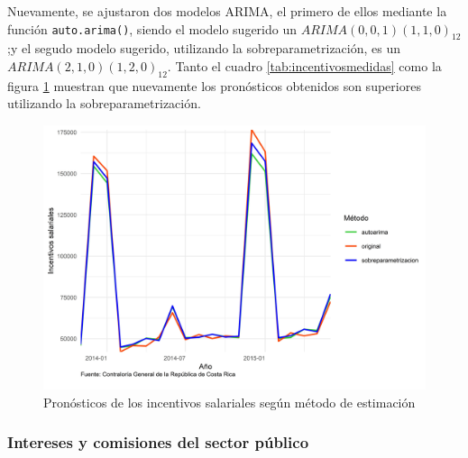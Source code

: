 \documentclass[
]{article}
\begin{document}
Nuevamente, se ajustaron dos modelos ARIMA, el primero de ellos mediante
la función \texttt{auto.arima()}, siendo el modelo sugerido un
\(ARIMA(0,0,1)(1,1,0)_{12}\);y el segudo modelo sugerido, utilizando la
sobreparametrización, es un \(ARIMA(2,1,0)(1,2,0)_{12}\). Tanto el
cuadro \ref{tab:incentivosmedidas} como la figura
\ref{fig:incentivosplotpronostico} muestran que nuevamente los
pronósticos obtenidos son superiores utilizando la sobreparametrización.

\begin{table}[!h]

\caption{\label{tab:unnamed-chunk-17}\label{tab:incentivosmedidas}Medidas de rendimiento según método de estimación para los incentivos salariales}
\centering
{}
\end{table}

\begin{figure}[!h]
\includegraphics[width=1\linewidth,height=1\textheight]{Tesis_files/figure-latex/incentivosplotpronostico-1} \caption{Pronósticos de los incentivos salariales según método de estimación}\label{fig:incentivosplotpronostico}
\end{figure}

\subsubsection{Intereses y comisiones del sector público}
\end{document}
